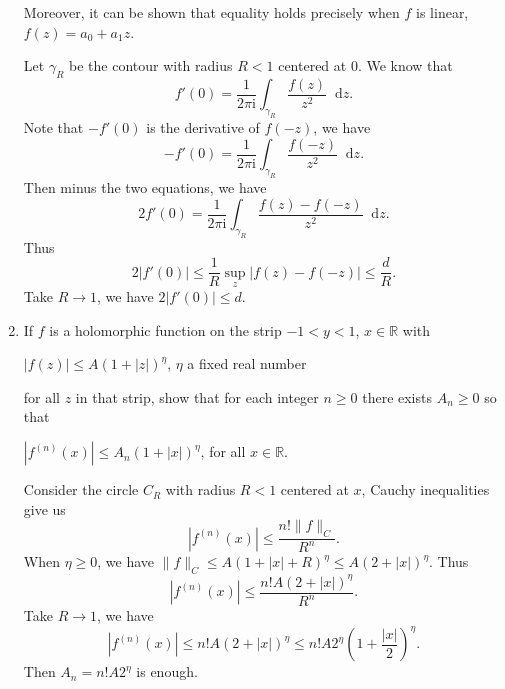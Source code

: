 \documentclass[11pt]{report}
\theoremstyle{mythm}
\let\oldendproof\endproof
\renewenvironment{proof}[1][\proofname]{%
  \oldproof[\normalfont \bfseries #1]%
}{\oldendproof}
\renewcommand*{\proofname}{Proof}
\theoremstyle{myans}
\newcommand{\mi}{\mathrm{i}}
\newcommand{\dd}{\mathop{}\!\mathrm{d}}
\newcommand{\bbR}{\mathbb{R}}
\newcommand{\norm}[1]{\|#1\|}
\begin{document}
\begin{enumerate}
  Moreover, it can be shown that equality holds precisely when $f$ is linear, $f(z) =
  a_0 +a_1z$.
  \begin{proof}
    Let $\gamma_R$ be the contour with radius $R<1$ centered at $0$. We know that
    \[ f'(0) = \frac 1{2\pi \mi}\int_{\gamma_R} \frac{f(z)}{z^2}\dd z. \]
    Note that $-f'(0)$ is the derivative of $f(-z)$, we have
    \[ -f'(0) = \frac 1{2\pi \mi}\int_{\gamma_R} \frac{f(-z)}{z^2}\dd z. \]
    Then minus the two equations, we have
    \[ 2f'(0) = \frac 1{2\pi \mi}\int_{\gamma_R} \frac{f(z)-f(-z)}{z^2}\dd z. \]
    Thus
    \[ 2|f'(0)| \leq \frac 1 R \sup_{z} |f(z) - f(-z)| \leq \frac d R. \]
    Take $R\to 1$, we have $2|f'(0)|\leq d$.
  \end{proof}
  \item If $f$ is a holomorphic function on the strip $-1 < y < 1$, $x \in \bbR$ with
  \begin{center}
    $|f(z)|\leq A(1+|z|)^\eta$, \quad $\eta$ a fixed real number
  \end{center}
  for all $z$ in that strip, show that for each integer $n \geq 0$ there exists $A_n\geq 0$ so that
  \begin{center}
    $|f^{(n)}(x)|\leq A_n(1+|x|)^\eta$, \quad for all $x\in\bbR$.
  \end{center}
  \begin{proof}
    Consider the circle $C_R$ with radius $R<1$ centered at $x$, Cauchy inequalities give us
    \[ |f^{(n)}(x)| \leq \frac{n!\norm{f}_C}{R^n}. \]
    When $\eta \geq 0$, we have $\norm{f}_C \leq A(1+|x|+R)^\eta \leq A(2+|x|)^\eta$. Thus
    \[ |f^{(n)}(x)| \leq \frac{n!A(2+|x|)^\eta}{R^n}. \]
    Take $R\to 1$, we have
    \[ |f^{(n)}(x)| \leq n!A(2+|x|)^\eta \leq n! A 2^\eta \left(1 + \frac{|x|}2\right)^\eta. \]
    Then $A_n= n! A 2^\eta$ is enough.
    

\end{proof}
\end{enumerate}
\end{document}
